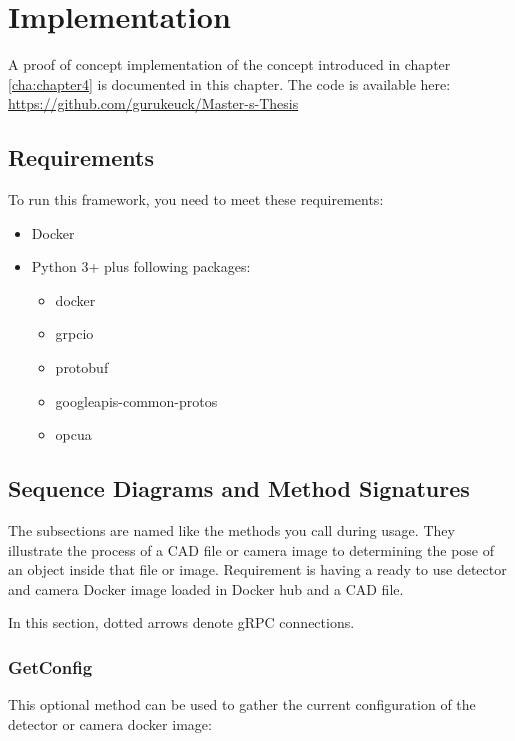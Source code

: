 \chapter{Implementation\label{cha:chapter5}}
A proof of concept implementation of the concept introduced in chapter \ref{cha:chapter4} is documented in this chapter. The code is available here: \url{https://github.com/gurukeuck/Master-s-Thesis}

\section{Requirements}
To run this framework, you need to meet these requirements:
\begin{itemize}
    \item Docker
    \item Python 3+ plus following packages:
    \begin{itemize}
        \item docker
        \item grpcio
        \item protobuf
        \item googleapis-common-protos
        \item opcua
    \end{itemize}
\end{itemize}

\section{Sequence Diagrams and Method Signatures}
The subsections are named like the methods you call during usage. They illustrate the process of a CAD file or camera image to determining the pose of an object inside that file or image. Requirement is having a ready to use detector and camera Docker image loaded in Docker hub and a CAD file. 

In this section, dotted arrows denote gRPC connections.

\subsection{GetConfig}
This optional method can be used to gather the current configuration of the detector or camera docker image:

